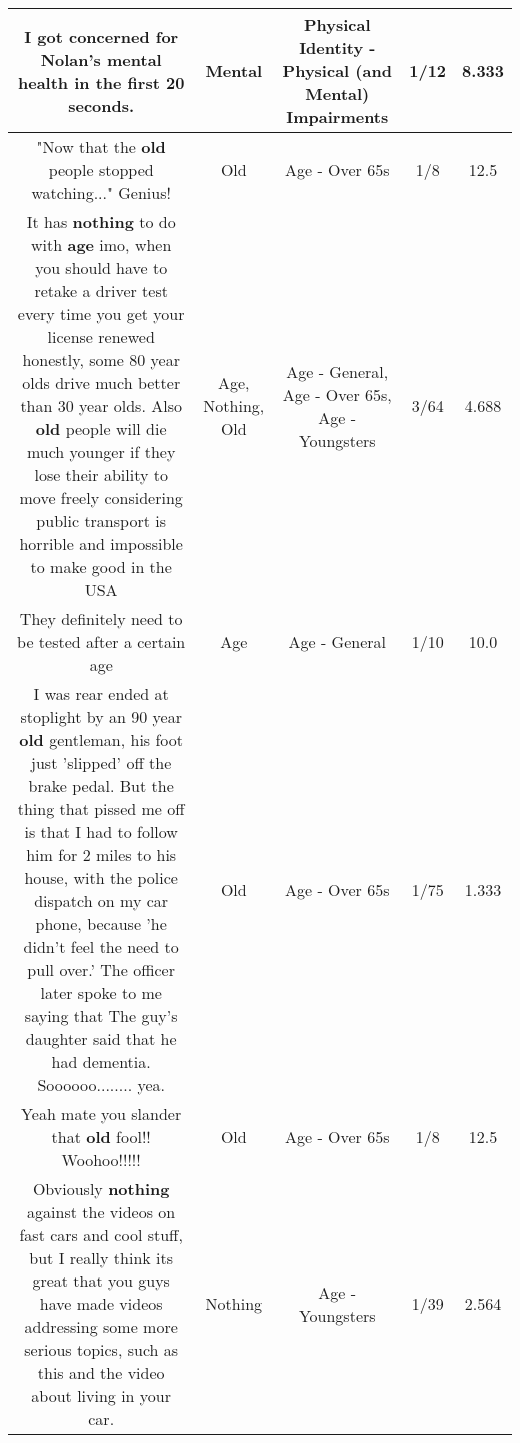 \documentclass[11pt]{article}
\newlength\mylength
\begin{document}
\begin{center}
\begin{longtable}{|C{.65\mylength}|C{.30\mylength}|C{.12\mylength}|C{.12\mylength}|C{.12\mylength}|}
  \small I got concerned for Nolan's \textbf{mental} health in the first 20 seconds.\normalsize   & Mental & Physical Identity - Physical (and Mental) Impairments & 1/12 & 8.333 \\  \hline
  \small "Now that the \textbf{old} people stopped watching..." Genius!\normalsize   & Old & Age - Over 65s & 1/8 & 12.5 \\  \hline
  \small It has \textbf{nothing} to do with \textbf{age} imo, when you should have to retake a driver test every time you get your license renewed honestly, some 80 year olds drive much better than 30 year olds. Also \textbf{old} people will die much younger if they lose their ability to move freely considering public transport is horrible and impossible to make good in the USA\normalsize   & Age, Nothing, Old & Age - General, Age - Over 65s, Age - Youngsters & 3/64 & 4.688 \\  \hline
  \small They definitely need to be tested after a certain age\normalsize   & Age & Age - General & 1/10 & 10.0 \\  \hline
  \small I was rear ended at stoplight by an 90 year \textbf{old} gentleman, his foot just 'slipped' off the brake pedal. But the thing that pissed me off is that I had to follow him for 2 miles to his house, with the police dispatch on my car phone, because 'he didn't feel the need to pull over.' The officer later spoke to me saying that The guy's daughter said that he had dementia. Soooooo........ yea.\normalsize   & Old & Age - Over 65s & 1/75 & 1.333 \\  \hline
  \small Yeah mate you slander that \textbf{old} fool!! Woohoo!!!!!\normalsize   & Old & Age - Over 65s & 1/8 & 12.5 \\  \hline
  \small Obviously \textbf{nothing} against the videos on fast cars and cool stuff, but I really think its great that you guys have made videos addressing some more serious topics, such as this and the video about living in your car.\normalsize   & Nothing & Age - Youngsters & 1/39 & 2.564 \\  \hline

\end{longtable}
\end{center}
\end{document}
